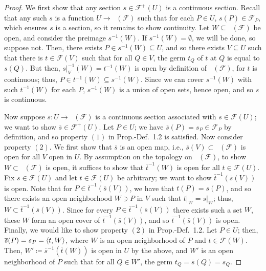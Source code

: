 \documentclass[12pt,letterpaper]{article}
\theoremstyle{definition}
\theoremstyle{remark}
\numberwithin{equation}{section}
\numberwithin{figure}{problem}
\DeclareMathOperator{\Spe}{Sp\acute{e}}
\begin{document}
\begin{proof}
  We first show that any section $s \in \mathscr{F}^+(U)$ is a continuous section. Recall that any such $s$ is a function $U \to \Spe(\mathscr{F})$ such that for each $P \in U$, $s(P) \in \mathscr{F}_P$, which ensures $s$ is a section, so it remains to show continuity. Let $W \subseteq \Spe(\mathscr{F})$ be open, and consider the preimage $s^{-1}(W)$. If $s^{-1}(W) = \emptyset$, we will be done, so suppose not. Then, there exists $P \in s^{-1}(W) \subseteq U$, and so there exists $V \subseteq U$ such that there is $t \in \mathscr{F}(V)$ such that for all $Q \in V$, the germ $t_Q$ of $t$ at $Q$ is equal to $s(Q)$. But then, $s\vert_V^{-1}(W) = t^{-1}(W)$ is open by definition of $\Spe(\mathscr{F})$, for $t$ is continuous; thus, $P \in t^{-1}(W) \subseteq s^{-1}(W)$. Since we can cover $s^{-1}(W)$ with such $t^{-1}(W)$ for each $P$, $s^{-1}(W)$ is a union of open sets, hence open, and so $s$ is continuous.
  \par Now suppose $\overline{s}\colon U \to \Spe(\mathscr{F})$ is a continuous section associated with $s \in \mathscr{F}(U)$; we want to show $\overline{s} \in \mathscr{F}^+(U)$. Let $P \in U$; we have $\overline{s}(P) = s_P \in \mathscr{F}_P$ by definition, and so property $(1)$ in Prop.-Def.~1.2 is satisfied. Now consider property $(2)$. We first show that $\overline{s}$ is an open map, i.e., $\overline{s}(V) \subset \Spe(\mathscr{F})$ is open for all $V$ open in $U$. By assumption on the topology on $\Spe(\mathscr{F})$, to show $W \subset \Spe(\mathscr{F})$ is open, it suffices to show that $\overline{t}^{-1}(W)$ is open for all $t \in \mathscr{F}(U)$. Fix $s \in \mathscr{F}(U)$ and let $t \in \mathscr{F}(U)$ be arbitrary; we want to show $\overline{t}^{-1}(\overline{s}(V))$ is open. Note that for $P \in \overline{t}^{-1}(\overline{s}(V))$, we have that $t(P) = s(P)$, and so there exists an open neighborhood $W \ni P$ in $V$ such that $t\vert_W = s\vert_W$; thus, $W \subset \overline{t}^{-1}(\overline{s}(V))$. Since for every $P \in \overline{t}^{-1}(\overline{s}(V))$ there exists such a set $W$, these $W$ form an open cover of $\overline{t}^{-1}(\overline{s}(V))$, and so $\overline{t}^{-1}(\overline{s}(V))$ is open. Finally, we would like to show property $(2)$ in Prop.-Def.~1.2. Let $P \in U$; then, $\overline{s}(P) = s_P = \braket{t,W}$, where $W$ is an open neighborhood of $P$ and $t \in \mathscr{F}(W)$. Then, $W' \coloneqq \overline{s}^{-1}(\overline{t}(W))$ is open in $U$ by the above, and $W'$ is an open neighborhood of $P$ such that for all $Q \in W'$, the germ $t_Q = \overline{s}(Q) = s_Q$.
\end{proof}
\end{document}
